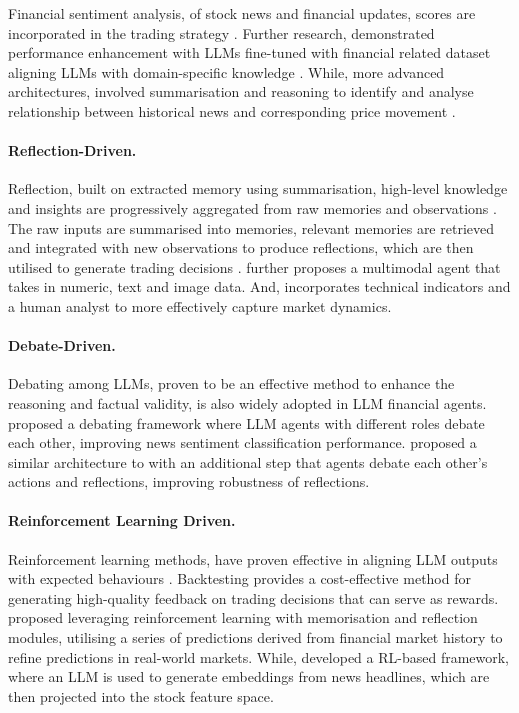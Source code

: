 \documentclass[conference]{IEEEtran}
\begin{document}
Financial sentiment analysis, of stock news and financial updates, scores are incorporated in the trading strategy \cite{lopezlira2023, wu2024llmnews}.
Further research, demonstrated performance enhancement with LLMs fine-tuned with financial related dataset aligning LLMs with domain-specific knowledge \cite{kirtac2024, zhang2024chinese}.
While, more advanced architectures, involved summarisation and reasoning to identify and analyse relationship between historical news and corresponding price movement \cite{fatouros2024, wang2024llmfactor}.

\paragraph{Reflection-Driven.}

Reflection, built on extracted memory using summarisation, high-level knowledge and insights are progressively aggregated from raw memories and observations \cite{park2023generative}.
The raw inputs are summarised into memories, relevant memories are retrieved and integrated with new observations to produce reflections, which are then utilised to generate trading decisions \cite{yu2023finmem}.
\cite{zhang2024finagent} further proposes a multimodal agent that takes in numeric, text and image data. And, incorporates technical indicators and a human analyst to more effectively capture market dynamics.

\paragraph{Debate-Driven.}

Debating among LLMs, proven to be an effective method to enhance the reasoning and factual validity, is also widely adopted in LLM financial agents.
\cite{xing2024} proposed a debating framework where LLM agents with different roles debate each other, improving news sentiment classification performance.
\cite{li2023tradinggpt} proposed a similar architecture to \cite{yu2023finmem} with an additional step that agents debate each other's actions and reflections, improving robustness of reflections.

\paragraph{Reinforcement Learning Driven.}

Reinforcement learning methods, have proven effective in aligning LLM outputs with expected behaviours \cite{ouyang2022instructgpt, lee2023rlaif}.
Backtesting provides a cost-effective method for generating high-quality feedback on trading decisions that can serve as rewards.
\cite{koa2024explainable} proposed leveraging reinforcement learning with memorisation and reflection modules, utilising a series of predictions derived from financial market history to refine predictions in real-world markets.
While, \cite{ding2023} developed a RL-based framework, where an LLM is used to generate embeddings from news headlines, which are then projected into the stock feature space.
\end{document}
